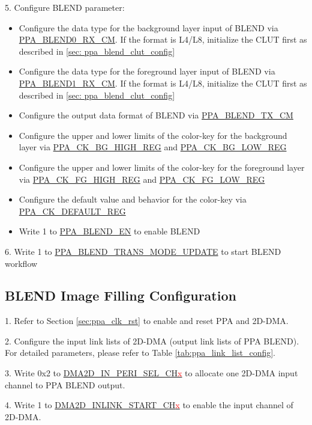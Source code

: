 \documentclass[main\_\_EN.tex]{subfiles}
\begin{document}
5. Configure BLEND parameter:
\begin{itemize}
    \item Configure the data type for the background layer input of BLEND via \hyperref[fielddesc:PPABLEND0RXCM]{PPA\_BLEND0\_RX\_CM}. If the format is L4/L8, initialize the CLUT first as described in \ref{sec: ppa_blend_clut_config}
    \item Configure the data type for the foreground layer input of BLEND via \hyperref[fielddesc:PPABLEND1RXCM]{PPA\_BLEND1\_RX\_CM}. If the format is L4/L8, initialize the CLUT first as described in \ref{sec: ppa_blend_clut_config}
    \item Configure the output data format of BLEND via \hyperref[fielddesc:PPABLENDTXCM]{PPA\_BLEND\_TX\_CM}
    \item Configure the upper and lower limits of the color-key for the background layer via \hyperref[regdesc:PPACKBGHIGHREG]{PPA\_CK\_BG\_HIGH\_REG} and \hyperref[regdesc:PPACKBGLOWREG]{PPA\_CK\_BG\_LOW\_REG}
    \item Configure the upper and lower limits of the color-key for the foreground layer via \hyperref[regdesc:PPACKFGHIGHREG]{PPA\_CK\_FG\_HIGH\_REG} and \hyperref[regdesc:PPACKFGLOWREG]{PPA\_CK\_FG\_LOW\_REG}
    \item Configure the default value and behavior for the color-key via \hyperref[regdesc:PPACKDEFAULTREG]{PPA\_CK\_DEFAULT\_REG}
    \item Write 1 to \hyperref[fielddesc:PPABLENDEN]{PPA\_BLEND\_EN} to enable BLEND
\end{itemize}

6. Write 1 to \hyperref[fielddesc:PPABLENDTRANSMODEUPDATE]{PPA\_BLEND\_TRANS\_MODE\_UPDATE} to start BLEND workflow

\subsection{BLEND Image Filling Configuration}
1. Refer to Section \ref{sec:ppa_clk_rst} to enable and reset PPA and 2D-DMA.

2. Configure the input link lists of 2D-DMA (output link lists of PPA BLEND). For detailed parameters, please refer to Table \ref{tab:ppa_link_list_config}.

3. Write 0x2 to \hyperref[fielddesc:DMA2DINPERISELCHN]{DMA2D\_IN\_PERI\_SEL\_CH\textcolor{red}{x}} to allocate one 2D-DMA input channel to PPA BLEND output.

4. Write 1 to \hyperref[fielddesc:DMA2DINLINKSTARTCHN]{DMA2D\_INLINK\_START\_CH\textcolor{red}{x}} to enable the input channel of 2D-DMA.
\end{document}
